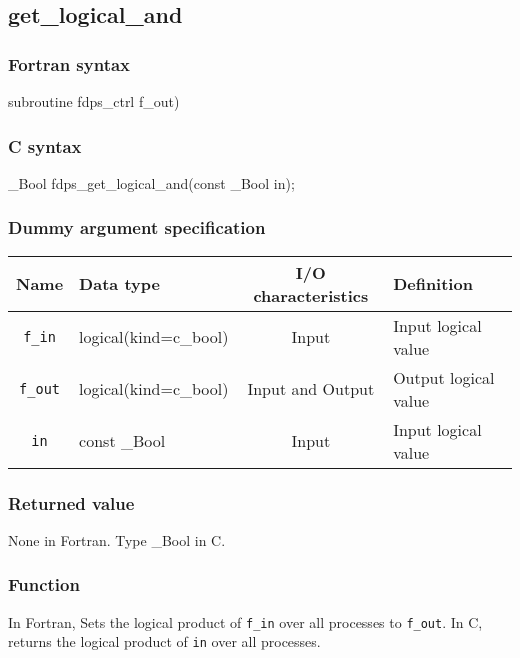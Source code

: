 \subsection{get\_logical\_and}
\subsubsection*{Fortran syntax}
\begin{screen}
\begin{spverbatim}
subroutine fdps_ctrl%
                                     f_out)
\end{spverbatim}
\end{screen}

\subsubsection*{C syntax}
\begin{screen}
\begin{spverbatim}
_Bool fdps_get_logical_and(const _Bool in);
\end{spverbatim}
\end{screen}

\subsubsection*{Dummy argument specification}
\begin{table}[h]
\begin{tabularx}{\linewidth}{cXcX}
\toprule
\rowcolor{Snow2}
Name & Data type & I/O characteristics & Definition \\
\midrule
\verb|f_in| & logical(kind=c\_bool) & Input & Input logical value\\
\verb|f_out| & logical(kind=c\_bool) & Input and Output & Output logical value\\
\verb|in| & const \_Bool & Input & Input logical value\\
\bottomrule
\end{tabularx}
\end{table}

\subsubsection*{Returned value}
None in Fortran. Type \_Bool in C.

\subsubsection*{Function}
In Fortran, Sets the logical product of {\tt f\_in} over all processes to \texttt{f\_out}. In C, returns the logical product of \texttt{in} over all processes.
\clearpage

